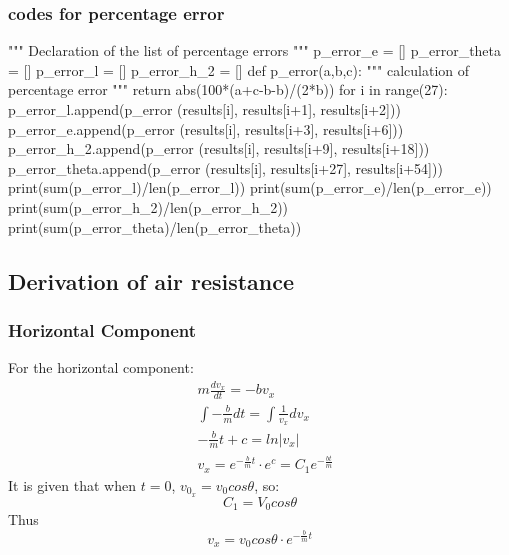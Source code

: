 \documentclass{article}
\begin{document}
    \subsubsection{codes for percentage error}\label{code:p_error}
    \begin{python}
"""
Declaration of the list
of percentage errors
"""
p_error_e = []
p_error_theta = []
p_error_l = []
p_error_h_2 = []
def p_error(a,b,c):
"""
calculation of percentage error
"""
    return abs(100*(a+c-b-b)/(2*b))
for i in range(27):
    p_error_l.append(p_error
                    (results[i],
                    results[i+1],
                    results[i+2]))
    p_error_e.append(p_error
                    (results[i],
                    results[i+3],
                    results[i+6]))
    p_error_h_2.append(p_error
                       (results[i],
                        results[i+9],
                        results[i+18]))
    p_error_theta.append(p_error
                         (results[i],
                          results[i+27],
                          results[i+54]))
print(sum(p_error_l)/len(p_error_l))
print(sum(p_error_e)/len(p_error_e))   
print(sum(p_error_h_2)/len(p_error_h_2))  
print(sum(p_error_theta)/len(p_error_theta)) 
    \end{python}
    \subsection{Derivation of air resistance}\label{derviair}
        \subsubsection{Horizontal Component}
        For the horizontal component:
        \begin{equation}
            \begin{aligned}
                &m\frac{dv_x}{dt}= -bv_x\\
                &\int-\frac{b}{m}dt = \int\frac{1}{v_x}dv_x\\
                &-\frac{b}{m}t+c = ln |v_x|\\
                &v_x = e^{-\frac{b}{m}t}\cdot e^c = C_1e^{-\frac{bt}{m}}
            \end{aligned}
        \end{equation}
        It is given that when $t = 0$, $v_{0_x} = v_0cos\theta$, so:
        $$C_1 = V_0cos\theta$$
        Thus
        \begin{equation} \label{x_air}
            v_x = v_0cos\theta \cdot e^{-\frac{b}{m}t}
        \end{equation}
\end{document}

